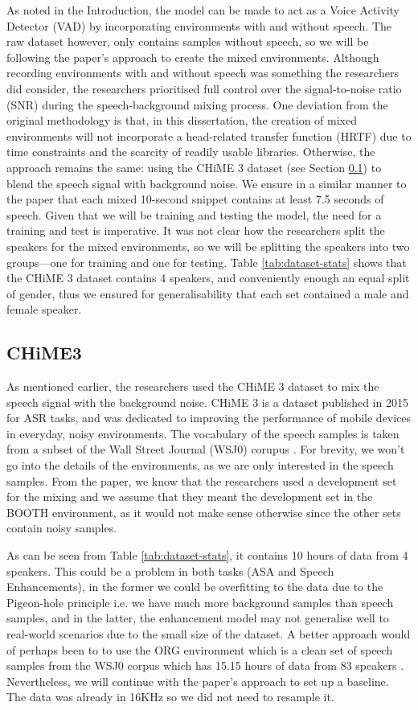 \documentclass[logo,bsc,singlespacing,parskip,online]{infthesis}
\begin{document}
As noted in the Introduction, the model can be made to act as a Voice Activity Detector (VAD) by incorporating environments with and without speech.
The raw dataset however, only contains samples without speech, so we will be following the paper's approach to create the mixed environments.
Although recording environments with and without speech was something the researchers did consider, the researchers prioritised full control over the signal-to-noise ratio (SNR) during the speech-background mixing process.
One deviation from the original methodology is that, in this dissertation, the creation of mixed environments will not incorporate a head-related transfer function (HRTF) due to time constraints and the scarcity of readily usable libraries.
Otherwise, the approach remains the same: using the CHiME 3 dataset (see Section \ref{}) to blend the speech signal with background noise.
We ensure in a similar manner to the paper that each mixed 10-second snippet contains at least 7.5 seconds of speech.
Given that we will be training and testing the model, the need for a training and test is imperative. 
It was not clear how the researchers split the speakers for the mixed environments, so we will be splitting the speakers into two groups—one for training and one for testing.
Table \ref{tab:dataset-stats} shows that the CHiME 3 dataset contains 4 speakers, and conveniently enough an equal split of gender,
thus we ensured for generalisability that each set contained a male and female speaker. 

\subsection{CHiME3}
 As mentioned earlier, the researchers used the CHiME 3 \cite{barker_third_2015} dataset to mix the speech signal with the background noise. 
CHiME 3 is a dataset published in 2015 for ASR tasks, and was dedicated to improving the performance of mobile devices 
in everyday, noisy environments. The vocabulary of the speech samples is taken from a subset of the Wall Street Journal (WSJ0) corupus \cite{TODO}.
For brevity, we won't go into the details of the environments, as we 
are only interested in the speech samples. 
From the paper, we know that the researchers used a development set for the mixing 
and we assume that they meant the development set in the BOOTH environment, as it would not make sense otherwise since the other sets contain noisy samples.

As can be seen from Table \ref{tab:dataset-stats}, it contains 10 hours of data from 4 speakers. This could be a problem in both tasks (ASA and Speech Enhancements), in the former
we could be overfitting to the data due to the Pigeon-hole principle i.e. we have much more background samples than speech samples, 
and in the latter, the enhancement model may not generalise well to real-world scenarios due to the small size of the dataset. 
A better approach would of perhaps been to to use the ORG environment which is a clean set of speech samples from the WSJ0 corpus 
which has 15.15 hours of data from 83 speakers \cite{barker_third_2015}.
Nevertheless, we will continue with the paper's approach to set up a baseline. The data was already in 16KHz so we did not need to 
resample it. 
\end{document}
